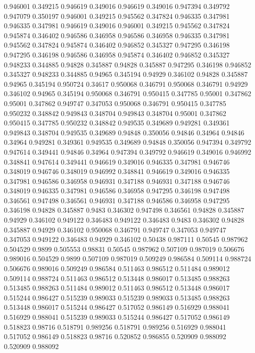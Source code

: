 0.946001 0.349215
0.946619 0.349016
0.946619 0.349016
0.947394 0.349792
0.947079 0.350197
0.946001 0.349215
0.945562 0.347824
0.946335 0.347981
0.946335 0.347981
0.946619 0.349016
0.946001 0.349215
0.945562 0.347824
0.945874 0.346402
0.946586 0.346958
0.946586 0.346958
0.946335 0.347981
0.945562 0.347824
0.945874 0.346402
0.946852 0.345327
0.947295 0.346198
0.947295 0.346198
0.946586 0.346958
0.945874 0.346402
0.946852 0.345327
0.948233 0.344885
0.94828 0.345887
0.94828 0.345887
0.947295 0.346198
0.946852 0.345327
0.948233 0.344885
0.94965 0.345194
0.94929 0.346102
0.94828 0.345887
0.94965 0.345194
0.950724 0.34617
0.950068 0.346791
0.950068 0.346791
0.94929 0.346102
0.94965 0.345194
0.950068 0.346791
0.950415 0.347785
0.95001 0.347862
0.95001 0.347862
0.949747 0.347053
0.950068 0.346791
0.950415 0.347785
0.950232 0.348842
0.949843 0.348704
0.949843 0.348704
0.95001 0.347862
0.950415 0.347785
0.950232 0.348842
0.949535 0.349689
0.949281 0.349361
0.949843 0.348704
0.949535 0.349689
0.94848 0.350056
0.94846 0.34964
0.94846 0.34964
0.949281 0.349361
0.949535 0.349689
0.94848 0.350056
0.947394 0.349792
0.947614 0.349441
0.94846 0.34964
0.947394 0.349792
0.946619 0.349016
0.946992 0.348841
0.947614 0.349441
0.946619 0.349016
0.946335 0.347981
0.946746 0.348019
0.946746 0.348019
0.946992 0.348841
0.946619 0.349016
0.946335 0.347981
0.946586 0.346958
0.946931 0.347188
0.946931 0.347188
0.946746 0.348019
0.946335 0.347981
0.946586 0.346958
0.947295 0.346198
0.947498 0.346561
0.947498 0.346561
0.946931 0.347188
0.946586 0.346958
0.947295 0.346198
0.94828 0.345887
0.9483 0.346302
0.947498 0.346561
0.94828 0.345887
0.94929 0.346102
0.949122 0.346483
0.949122 0.346483
0.9483 0.346302
0.94828 0.345887
0.94929 0.346102
0.950068 0.346791
0.949747 0.347053
0.949747 0.347053
0.949122 0.346483
0.94929 0.346102
0.50438 0.987111
0.50545 0.987962
0.504529 0.9899
0.505553 0.98831
0.50545 0.987962
0.507109 0.987019
0.506676 0.989016
0.504529 0.9899
0.507109 0.987019
0.509249 0.986584
0.509114 0.988724
0.506676 0.989016
0.509249 0.986584
0.511463 0.986512
0.511484 0.989012
0.509114 0.988724
0.511463 0.986512
0.513448 0.986017
0.513485 0.988263
0.513485 0.988263
0.511484 0.989012
0.511463 0.986512
0.513448 0.986017
0.515244 0.986427
0.515239 0.989033
0.515239 0.989033
0.513485 0.988263
0.513448 0.986017
0.515244 0.986427
0.517052 0.986149
0.516929 0.988041
0.516929 0.988041
0.515239 0.989033
0.515244 0.986427
0.517052 0.986149
0.518823 0.98716
0.518791 0.989256
0.518791 0.989256
0.516929 0.988041
0.517052 0.986149
0.518823 0.98716
0.520852 0.986855
0.520909 0.988092
0.520909 0.988092
